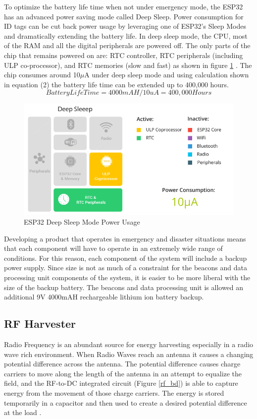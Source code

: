\pagebreak
To optimize the battery life time when not under emergency mode, the ESP32 has an advanced power saving mode called Deep Sleep. Power consumption for ID tags can be cut back power usage by leveraging one of ESP32’s Sleep Modes and dramatically extending the battery life. In deep sleep mode, the CPU, most of the RAM and all the digital peripherals are powered off. The only parts of the chip that remains powered on are: RTC controller, RTC peripherals (including ULP co-processor), and RTC memories (slow and fast) as shown in figure \ref{ds_mode} \cite{R5-1-1}. The chip consumes around 10\(\mu\)A under deep sleep mode and using calculation shown in equation (2) the battery life time can be extended up to 400,000 hours.
\medskip
\begin{equation}
Battery Life Time = 4000mAH/10uA = 400,000 Hours
\end{equation}

\medskip
\begin{figure}[H]
\centering
    \includegraphics[scale=0.7]{./images/ds_mode.png}
    \caption{ESP32 Deep Sleep Mode Power Usage}
    \label{ds_mode}
\end{figure}

\bigskip
Developing a product that operates in emergency and disaster situations means that each component will have to operate in an extremely wide range of conditions. For this reason, each component of the system will include a backup power supply. Since size is not as much of a constraint for the beacons and data processing unit components of the system, it is easier to be more liberal with the size of the backup battery. The beacons and data processing unit is allowed an additional 9V 4000mAH rechargeable lithium ion battery backup. 


\pagebreak
\subsection{RF Harvester}
\medskip
Radio Frequency is an abundant source for energy harvesting especially in a radio wave rich environment. When Radio Waves reach an antenna it causes a changing potential difference across the antenna. The potential difference causes charge carriers to move along the length of the antenna in an attempt to equalize the field, and the RF-to-DC integrated circuit (Figure \ref{rf_bd}) is able to capture energy from the movement of those charge carriers. The energy is stored temporarily in a capacitor and then used to create a desired potential difference at the load \cite{R5-2-1}.

